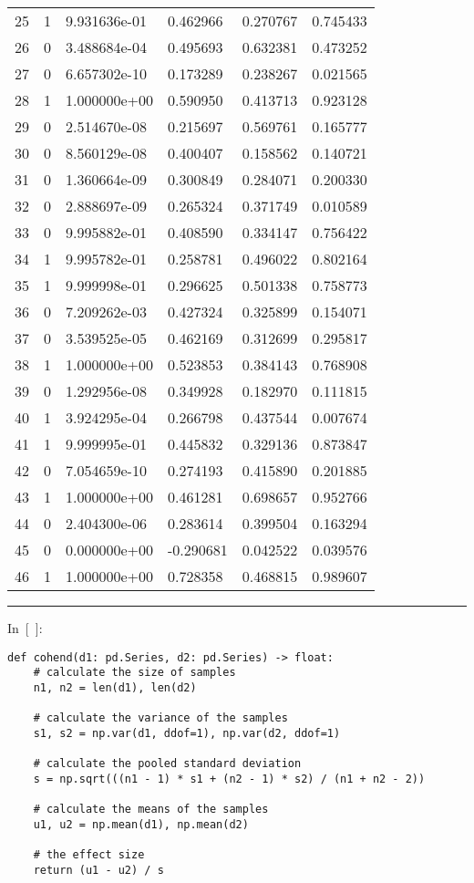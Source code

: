 \documentclass[
]{article}
\begin{document}
\begin{longtable}[]{@{}llllll@{}}
25 & 1 & 9.931636e-01 & 0.462966 & 0.270767 & 0.745433 \\
26 & 0 & 3.488684e-04 & 0.495693 & 0.632381 & 0.473252 \\
27 & 0 & 6.657302e-10 & 0.173289 & 0.238267 & 0.021565 \\
28 & 1 & 1.000000e+00 & 0.590950 & 0.413713 & 0.923128 \\
29 & 0 & 2.514670e-08 & 0.215697 & 0.569761 & 0.165777 \\
30 & 0 & 8.560129e-08 & 0.400407 & 0.158562 & 0.140721 \\
31 & 0 & 1.360664e-09 & 0.300849 & 0.284071 & 0.200330 \\
32 & 0 & 2.888697e-09 & 0.265324 & 0.371749 & 0.010589 \\
33 & 0 & 9.995882e-01 & 0.408590 & 0.334147 & 0.756422 \\
34 & 1 & 9.995782e-01 & 0.258781 & 0.496022 & 0.802164 \\
35 & 1 & 9.999998e-01 & 0.296625 & 0.501338 & 0.758773 \\
36 & 0 & 7.209262e-03 & 0.427324 & 0.325899 & 0.154071 \\
37 & 0 & 3.539525e-05 & 0.462169 & 0.312699 & 0.295817 \\
38 & 1 & 1.000000e+00 & 0.523853 & 0.384143 & 0.768908 \\
39 & 0 & 1.292956e-08 & 0.349928 & 0.182970 & 0.111815 \\
40 & 1 & 3.924295e-04 & 0.266798 & 0.437544 & 0.007674 \\
41 & 1 & 9.999995e-01 & 0.445832 & 0.329136 & 0.873847 \\
42 & 0 & 7.054659e-10 & 0.274193 & 0.415890 & 0.201885 \\
43 & 1 & 1.000000e+00 & 0.461281 & 0.698657 & 0.952766 \\
44 & 0 & 2.404300e-06 & 0.283614 & 0.399504 & 0.163294 \\
45 & 0 & 0.000000e+00 & -0.290681 & 0.042522 & 0.039576 \\
46 & 1 & 1.000000e+00 & 0.728358 & 0.468815 & 0.989607 \\
\bottomrule
\end{longtable}

\begin{center}\rule{0.5\linewidth}{0.5pt}\end{center}

In~{[}~{]}:

\begin{verbatim}
def cohend(d1: pd.Series, d2: pd.Series) -> float:
    # calculate the size of samples
    n1, n2 = len(d1), len(d2)

    # calculate the variance of the samples
    s1, s2 = np.var(d1, ddof=1), np.var(d2, ddof=1)

    # calculate the pooled standard deviation
    s = np.sqrt(((n1 - 1) * s1 + (n2 - 1) * s2) / (n1 + n2 - 2))

    # calculate the means of the samples
    u1, u2 = np.mean(d1), np.mean(d2)

    # the effect size
    return (u1 - u2) / s
    
\end{verbatim}
\end{document}
